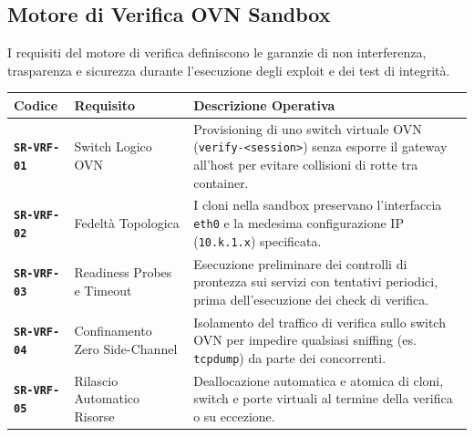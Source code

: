 \subsection{Motore di Verifica OVN
Sandbox}\label{motore-di-verifica-ovn-sandbox}

I requisiti del motore di verifica definiscono le garanzie di non
interferenza, trasparenza e sicurezza durante l'esecuzione degli exploit
e dei test di integrità.

\begin{longtable}[]{@{}
  >{\raggedright\arraybackslash}p{}
  >{\raggedright\arraybackslash}p{}
  >{\raggedright\arraybackslash}p{}@{}}
\toprule\noalign{}
\begin{minipage}[b]{\linewidth}\raggedright
Codice
\end{minipage} & \begin{minipage}[b]{\linewidth}\raggedright
Requisito
\end{minipage} & \begin{minipage}[b]{\linewidth}\raggedright
Descrizione Operativa
\end{minipage} \\
\midrule\noalign{}
\endhead
\bottomrule\noalign{}
\endlastfoot
\textbf{\passthrough{\lstinline!SR-VRF-01!}} & Switch Logico OVN &
Provisioning di uno switch virtuale OVN
(\passthrough{\lstinline!verify-<session>!}) senza esporre il gateway
all'host per evitare collisioni di rotte tra container. \\
\textbf{\passthrough{\lstinline!SR-VRF-02!}} & Fedeltà Topologica & I
cloni nella sandbox preservano l'interfaccia
\passthrough{\lstinline!eth0!} e la medesima configurazione IP
(\passthrough{\lstinline!10.k.1.x!}) specificata. \\
\textbf{\passthrough{\lstinline!SR-VRF-03!}} & Readiness Probes e
Timeout & Esecuzione preliminare dei controlli di prontezza sui servizi
con tentativi periodici, prima dell'esecuzione dei check di verifica. \\
\textbf{\passthrough{\lstinline!SR-VRF-04!}} & Confinamento Zero
Side-Channel & Isolamento del traffico di verifica sullo switch OVN per
impedire qualsiasi sniffing (es. \passthrough{\lstinline!tcpdump!}) da
parte dei concorrenti. \\
\textbf{\passthrough{\lstinline!SR-VRF-05!}} & Rilascio Automatico
Risorse & Deallocazione automatica e atomica di cloni, switch e porte
virtuali al termine della verifica o su eccezione. \\
\end{longtable}

